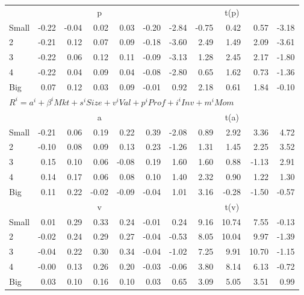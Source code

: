 \begin{tabular}{lrrrrrrrrrr}
  
     & \multicolumn{5}{c}{p} & \multicolumn{5}{c}{t(p)}   \\
     \cmidrule(r){2-6} \cmidrule(r){7-11} 
    Small  & -0.22  & -0.04  & 0.02  & 0.03  & -0.20  & -2.84  & -0.75  & 0.42  & 0.57  & -3.18   \\
    2  & -0.21  & 0.12  & 0.07  & 0.09  & -0.18  & -3.60  & 2.49  & 1.49  & 2.09  & -3.61   \\
    3  & -0.22  & 0.06  & 0.12  & 0.11  & -0.09  & -3.13  & 1.28  & 2.45  & 2.17  & -1.80   \\
    4  & -0.22  & 0.04  & 0.09  & 0.04  & -0.08  & -2.80  & 0.65  & 1.62  & 0.73  & -1.36   \\
    Big  & 0.07  & 0.12  & 0.03  & 0.09  & -0.01  & 0.92  & 2.18  & 0.61  & 1.84  & -0.10   \\


    \midrule
  \multicolumn{11}{l}{$R^i=a^i+\beta^iMkt+s^iSize+v^iVal+p^iProf+i^iInv+m^iMom$}  \\
  
     & \multicolumn{5}{c}{a} & \multicolumn{5}{c}{t(a)}   \\
     \cmidrule(r){2-6} \cmidrule(r){7-11} 
    Small  & -0.21  & 0.06  & 0.19  & 0.22  & 0.39  & -2.08  & 0.89  & 2.92  & 3.36  & 4.72   \\
    2  & -0.10  & 0.08  & 0.09  & 0.13  & 0.23  & -1.26  & 1.31  & 1.45  & 2.25  & 3.52   \\
    3  & 0.15  & 0.10  & 0.06  & -0.08  & 0.19  & 1.60  & 1.60  & 0.88  & -1.13  & 2.91   \\
    4  & 0.14  & 0.17  & 0.06  & 0.08  & 0.10  & 1.40  & 2.32  & 0.90  & 1.22  & 1.30   \\
    Big  & 0.11  & 0.22  & -0.02  & -0.09  & -0.04  & 1.01  & 3.16  & -0.28  & -1.50  & -0.57   \\


     & \multicolumn{5}{c}{v} & \multicolumn{5}{c}{t(v)}   \\
     \cmidrule(r){2-6} \cmidrule(r){7-11} 
    Small  & 0.01  & 0.29  & 0.33  & 0.24  & -0.01  & 0.24  & 9.16  & 10.74  & 7.55  & -0.13   \\
    2  & -0.02  & 0.24  & 0.29  & 0.27  & -0.04  & -0.53  & 8.05  & 10.04  & 9.97  & -1.39   \\
    3  & -0.04  & 0.22  & 0.30  & 0.34  & -0.04  & -1.02  & 7.25  & 9.91  & 10.70  & -1.15   \\
    4  & -0.00  & 0.13  & 0.26  & 0.20  & -0.03  & -0.06  & 3.80  & 8.14  & 6.13  & -0.72   \\
    Big  & 0.03  & 0.10  & 0.16  & 0.10  & 0.03  & 0.65  & 3.09  & 5.05  & 3.51  & 0.99   \\
    

\end{tabular}
